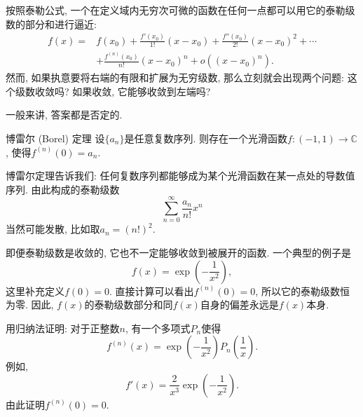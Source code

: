 

按照泰勒公式, 一个在定义域内无穷次可微的函数在任何一点都可以用它的泰勒级数的部分和进行逼近:
$$
\begin{aligned}
f(x)=&f(x_0)+\frac{f'(x_0)}{1!}(x-x_0)+\frac{f''(x_0)}{2!}(x-x_0)^2+\cdots\\
&+\frac{f^{(n)}(x_0)}{n!}(x-x_0)^n+o((x-x_0)^n).
\end{aligned}
$$
然而, 如果执意要将右端的有限和扩展为无穷级数, 那么立刻就会出现两个问题: 这个级数收敛吗? 如果收敛, 它能够收敛到左端吗?

一般来讲, 答案都是否定的. 

\begin{theorem}{博雷尔 (Borel) 定理}
设$\{a_n\}$是任意复数序列. 则存在一个光滑函数$f:(-1,1)\to\mathbb{C}$, 使得$f^{(n)}(0)=a_n$.
\end{theorem}
博雷尔定理告诉我们: 任何复数序列都能够成为某个光滑函数在某一点处的导数值序列. 由此构成的泰勒级数
$$
\sum_{n=0}^\infty\frac{a_n}{n!}x^n
$$
当然可能发散, 比如取$a_n=(n!)^2$.

即便泰勒级数是收敛的, 它也不一定能够收敛到被展开的函数. 一个典型的例子是
$$
f(x)=\exp\left(-\frac{1}{x^2}\right),
$$
这里补充定义$f(0)=0$. 直接计算可以看出$f^{(n)}(0)=0$, 所以它的泰勒级数恒为零. 因此, $f(x)$的泰勒级数部分和同$f(x)$自身的偏差永远是$f(x)$本身.

\begin{exercise}{}
用归纳法证明: 对于正整数$n$, 有一个多项式$P_n$使得
$$
f^{(n)}(x)=\exp\left(-\frac{1}{x^2}\right)P_n\left(\frac{1}{x}\right).
$$
例如, 
$$
f'(x)=\frac{2}{x^3}\exp\left(-\frac{1}{x^2}\right).
$$
由此证明$f^{(n)}(0)=0$.
\end{exercise}